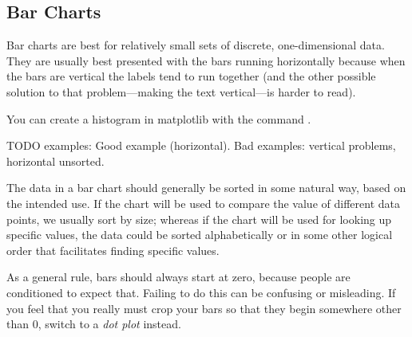 \begin{enumerate}
%
%
%
%
\end{enumerate}

\subsection*{Bar Charts}

Bar charts are best for relatively small sets of discrete, one-dimensional data.  They are usually best presented with the bars running horizontally because when the bars are vertical the labels tend to run together (and the other possible solution to that problem---making the text vertical---is harder to read).  

You can create a histogram in matplotlib with the command . 


TODO examples: Good example (horizontal). Bad examples: vertical problems, horizontal unsorted.


The data in a bar chart should generally be sorted in some natural way, based on the intended use.  If the chart will be used to compare the value of different data points, we usually sort by size; whereas if the chart will be used for looking up specific values, the data could be sorted alphabetically or in some other logical order that facilitates finding specific values.

As a general rule, bars should always start at zero, because people are conditioned to expect that.  Failing to do this can be confusing or misleading.  If you feel that you really must crop your bars so that they begin somewhere other than $0$, switch to a \emph{dot plot} instead.

